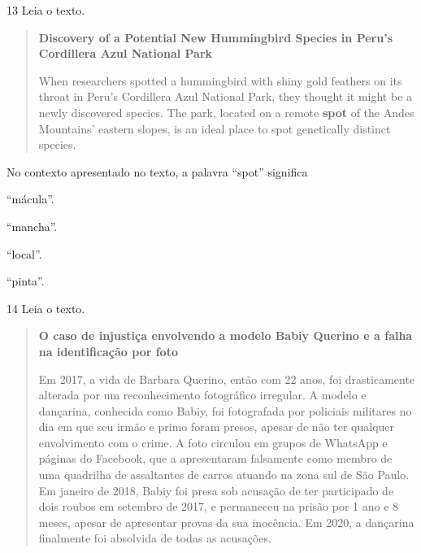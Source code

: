 \num{13} Leia o texto.

\begin{quote}
\textbf{Discovery of a Potential New Hummingbird Species in Peru's
Cordillera Azul National Park}

When researchers spotted a hummingbird with shiny gold feathers on its
throat in Peru's Cordillera Azul National Park, they thought it might be
a newly discovered species. The park, located on a remote \textbf{spot}
of the Andes Mountains' eastern slopes, is an ideal place to spot
genetically distinct species.

\end{quote}

\pagebreak
No contexto apresentado no texto, a palavra ``spot'' significa

\begin{escolha}
\item ``mácula''.

\item ``mancha''.

\item ``local''.

\item ``pinta''.
\end{escolha}

\num{14} Leia o texto.

\begin{quote}
\textbf{O caso de injustiça envolvendo a modelo Babiy Querino e a falha na identificação por foto}

Em 2017, a vida de Barbara Querino, então com 22 anos, foi drasticamente alterada por um reconhecimento 
fotográfico irregular. A modelo e dançarina, conhecida como Babiy, foi fotografada por policiais militares 
no dia em que seu irmão e primo foram presos, apesar de não ter qualquer envolvimento com o crime. A foto 
circulou em grupos de WhatsApp e páginas do Facebook, que a apresentaram falsamente como membro de uma 
quadrilha de assaltantes de carros atuando na zona sul de São Paulo. Em janeiro de 2018, Babiy foi presa 
sob acusação de ter participado de dois roubos em setembro de 2017, e permaneceu na prisão por 1 ano e 8 
meses, apesar de apresentar provas da sua inocência. Em 2020, a dançarina finalmente foi absolvida de todas 
as acusações.

\end{quote}

